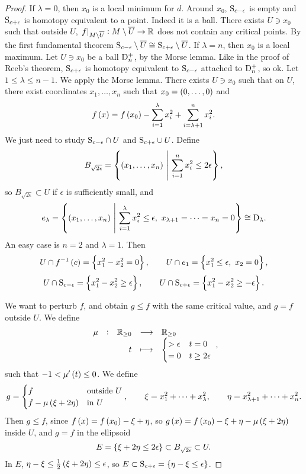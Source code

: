 \begin{proof}
If $ \lambda = 0 $, then $ x_0 $ is a local minimum for $ d $. Around $ x_0 $, $ \S_{c - \epsilon} $ is empty and $ \S_{c + \epsilon} $ is homotopy equivalent to a point. Indeed it is a ball. There exists $ U \ni x_0 $ such that outside $ U $, $ \eval{f}_{M \setminus \overline{U}} : M \setminus \overline{U} \to \RR $ does not contain any critical points. By the first fundamental theorem $ \S_{c - \epsilon} \setminus \overline{U} \cong \S_{c + \epsilon} \setminus \overline{U} $. If $ \lambda = n $, then $ x_0 $ is a local maximum. Let $ U \ni x_0 $ be a ball $ \D_n^+ $, by the Morse lemma. Like in the proof of Reeb's theorem, $ \S_{c + \epsilon} $ is homotopy equivalent to $ \S_{c - \epsilon} $ attached to $ \D_n^+ $, so ok. Let $ 1 \le \lambda \le n - 1 $. We apply the Morse lemma. There exists $ U \ni x_0 $ such that on $ U $, there exist coordinates $ x_1, \dots, x_n $ such that $ x_0 = \br{0, \dots, 0} $ and
$$ f\br{x} = f\br{x_0} - \sum_{i = 1}^\lambda x_i^2 + \sum_{i = \lambda + 1}^n x_i^2. $$
We just need to study $ \S_{c - \epsilon} \cap U $ and $ \S_{c + \epsilon} \cup U $. Define
$$ B_{\sqrt{2\epsilon}} = \cbr{\br{x_1, \dots, x_n} \st \sum_{i = 1}^n x_i^2 \le 2\epsilon}, $$
so $ B_{\sqrt{2\epsilon}} \subset U $ if $ \epsilon $ is sufficiently small, and
$$ e_\lambda = \cbr{\br{x_1, \dots, x_n} \st \sum_{i = 1}^\lambda x_i^2 \le \epsilon, \ x_{\lambda + 1} = \dots = x_n = 0} \cong \D_\lambda. $$
An easy case is $ n = 2 $ and $ \lambda = 1 $. Then
$$ U \cap f^{-1}\br{c} = \cbr{x_1^2 - x_2^2 = 0}, \qquad U \cap e_1 = \cbr{x_1^2 \le \epsilon, \ x_2 = 0}, $$
$$ U \cap \S_{c - \epsilon} = \cbr{x_1^2 - x_2^2 \ge \epsilon}, \qquad U \cap \S_{c + \epsilon} = \cbr{x_1^2 - x_2^2 \ge -\epsilon}. $$

\pagebreak

We want to perturb $ f $, and obtain $ g \le f $ with the same critical value, and $ g = f $ outside $ U $. We define
$$ \function[\mu]{\RR_{\ge 0}}{\RR_{\ge 0}}{t}{
\begin{cases}
> \epsilon & t = 0 \\
= 0 & t \ge 2\epsilon
\end{cases}
}, $$
such that $ -1 < \mu'\br{t} \le 0 $. We define
$$ g =
\begin{cases}
f & \text{outside} \ U \\
f - \mu\br{\xi + 2\eta} & \text{in} \ U
\end{cases},
\qquad \xi = x_1^2 + \dots + x_\lambda^2, \qquad \eta = x_{\lambda + 1}^2 + \dots + x_n^2. $$
Then $ g \le f $, since $ f\br{x} = f\br{x_0} - \xi + \eta $, so $ g\br{x} = f\br{x_0} - \xi + \eta - \mu\br{\xi + 2\eta} $ inside $ U $, and $ g = f $ in the ellipsoid
$$ E = \cbr{\xi + 2\eta \le 2\epsilon} \subset B_{\sqrt{2\epsilon}} \subset U. $$
In $ E $, $ \eta - \xi \le \tfrac{1}{2}\br{\xi + 2\eta} \le \epsilon $, so $ E \subset \S_{c + \epsilon} = \cbr{\eta - \xi \le \epsilon} $.


\end{proof}
